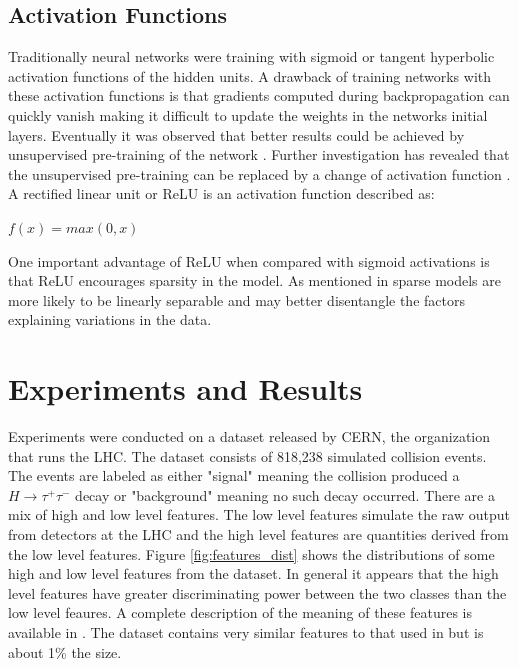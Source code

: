 \documentclass[12pt,letterpaper]{article}
\begin{document}
\subsection{Activation Functions}
Traditionally neural networks were training with sigmoid or tangent hyperbolic activation functions of the hidden units.  A drawback of training networks with these activation functions is that gradients computed during backpropagation can quickly vanish making it difficult to update the weights in the networks initial layers.  Eventually it was observed that better results could be achieved by unsupervised pre-training of the network \cite{Vincent:2010:SDA:1756006.1953039}. Further investigation has revealed that the unsupervised pre-training can be replaced by a change of activation function \cite{AISTATS2011_GlorotBB11}.  A rectified linear unit or ReLU is an activation function described as:

$f(x) = max(0,x)$

One important advantage of ReLU when compared with sigmoid activations is that ReLU encourages sparsity in the model.  As mentioned in \cite{AISTATS2011_GlorotBB11} sparse models are more likely to be linearly separable and may better disentangle the factors explaining variations in the data.

\section{Experiments and Results}

Experiments were conducted on a dataset released by CERN, the organization that runs the LHC.  The dataset consists of 818,238 simulated collision events.  The events are labeled as either "signal" meaning the collision produced a $H \rightarrow \tau^+ \tau^-$ decay or "background" meaning no such decay occurred.  There are a mix of high and low level features.  The low level features simulate the raw output from detectors at the LHC and the high level features are quantities derived from the low level features.  Figure \ref{fig:features_dist} shows the distributions of some high and low level features from the dataset.  In general it appears that the high level features have greater discriminating power between the two classes than the low level feaures.  A complete description of the meaning of these features is available in \cite{pmlr-v42-cowa14}.  The dataset contains very similar features to that used in \cite{Baldi:2014pta} but is about 1\% the size.
\end{document}
